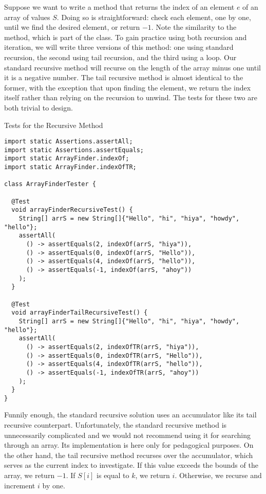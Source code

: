 \example Suppose we want to write a method that returns the index of an element $e$ of an array of  values $S$. Doing so is straightforward: check each element, one by one, until we find the desired element, or return $-1$. Note the similarity to the  method, which is part of the  class. To gain practice using both recursion and iteration, we will write three versions of this method: one using standard recursion, the second using tail recursion, and the third using a loop. Our standard recursive method will recurse on the length of the array minus one until it is a negative number. The tail recursive method is almost identical to the former, with the exception that upon finding the element, we return the index itself rather than relying on the recursion to unwind. The tests for these two are both trivial to design.

\begin{cl}{Tests for the Recursive  Method}
\begin{lstlisting}[language=MyJava]
import static Assertions.assertAll;
import static Assertions.assertEquals;
import static ArrayFinder.indexOf;
import static ArrayFinder.indexOfTR;

class ArrayFinderTester {

  @Test
  void arrayFinderRecursiveTest() {
    String[] arrS = new String[]{"Hello", "hi", "hiya", "howdy", "hello"};
    assertAll(
      () -> assertEquals(2, indexOf(arrS, "hiya")),
      () -> assertEquals(0, indexOf(arrS, "Hello")),
      () -> assertEquals(4, indexOf(arrS, "hello")),
      () -> assertEquals(-1, indexOf(arrS, "ahoy"))
    );
  }

  @Test
  void arrayFinderTailRecursiveTest() {
    String[] arrS = new String[]{"Hello", "hi", "hiya", "howdy", "hello"};
    assertAll(
      () -> assertEquals(2, indexOfTR(arrS, "hiya")),
      () -> assertEquals(0, indexOfTR(arrS, "Hello")),
      () -> assertEquals(4, indexOfTR(arrS, "hello")),
      () -> assertEquals(-1, indexOfTR(arrS, "ahoy"))
    );
  }
}
\end{lstlisting}
\end{cl}

Funnily enough, the standard recursive solution uses an accumulator like its tail recursive counterpart. Unfortunately, the standard recursive method is unnecessarily complicated and we would not recommend using it for searching through an array. Its implementation is here only for pedagogical purposes. On the other hand, the tail recursive method recurses over the accumulator, which serves as the current index to investigate. If this value exceeds the bounds of the array, we return $-1$. If $S[i]$ is equal to $k$, we return $i$. Otherwise, we recurse and increment $i$ by one.

